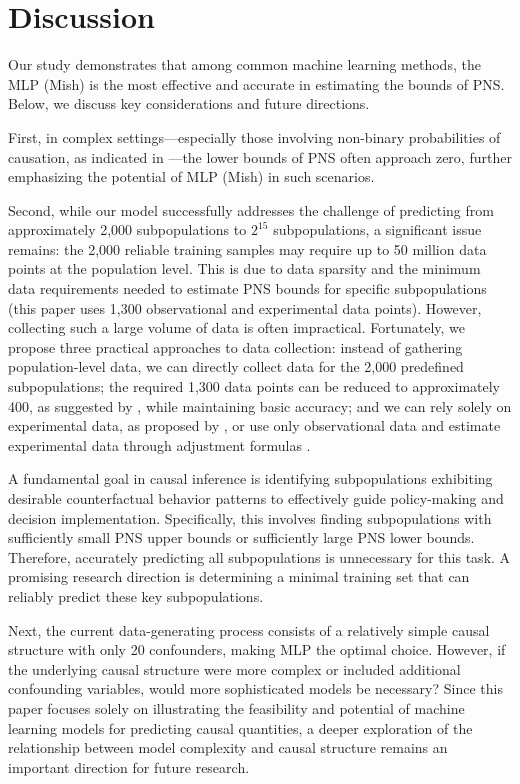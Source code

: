 \section{Discussion}
Our study demonstrates that among common machine learning methods, the MLP (Mish) is the most effective and accurate in estimating the bounds of PNS. Below, we discuss key considerations and future directions.  

First, in complex settings—especially those involving non-binary probabilities of causation, as indicated in \citep{li2024probabilities,zhang2024causal}—the lower bounds of PNS often approach zero, further emphasizing the potential of MLP (Mish) in such scenarios.  

Second, while our model successfully addresses the challenge of predicting from approximately 2,000 subpopulations to \(2^{15}\) subpopulations, a significant issue remains: the 2,000 reliable training samples may require up to 50 million data points at the population level. This is due to data sparsity and the minimum data requirements needed to estimate PNS bounds for specific subpopulations (this paper uses 1,300 observational and experimental data points). However, collecting such a large volume of data is often impractical. Fortunately, we propose three practical approaches to data collection: instead of gathering population-level data, we can directly collect data for the 2,000 predefined subpopulations; the required 1,300 data points can be reduced to approximately 400, as suggested by \cite{li2022probabilities}, while maintaining basic accuracy; and we can rely solely on experimental data, as proposed by \cite{li2023probabilities}, or use only observational data and estimate experimental data through adjustment formulas \citep{pearl1993aspects, pearl1995causal}.  

A fundamental goal in causal inference is identifying subpopulations exhibiting desirable counterfactual behavior patterns \citep{li2019unit} to effectively guide policy-making and decision implementation. Specifically, this involves finding subpopulations with sufficiently small PNS upper bounds or sufficiently large PNS lower bounds. Therefore, accurately predicting all subpopulations is unnecessary for this task. A promising research direction is determining a minimal training set that can reliably predict these key subpopulations.  

Next, the current data-generating process consists of a relatively simple causal structure with only 20 confounders, making MLP the optimal choice. However, if the underlying causal structure were more complex or included additional confounding variables, would more sophisticated models be necessary? Since this paper focuses solely on illustrating the feasibility and potential of machine learning models for predicting causal quantities, a deeper exploration of the relationship between model complexity and causal structure remains an important direction for future research.

